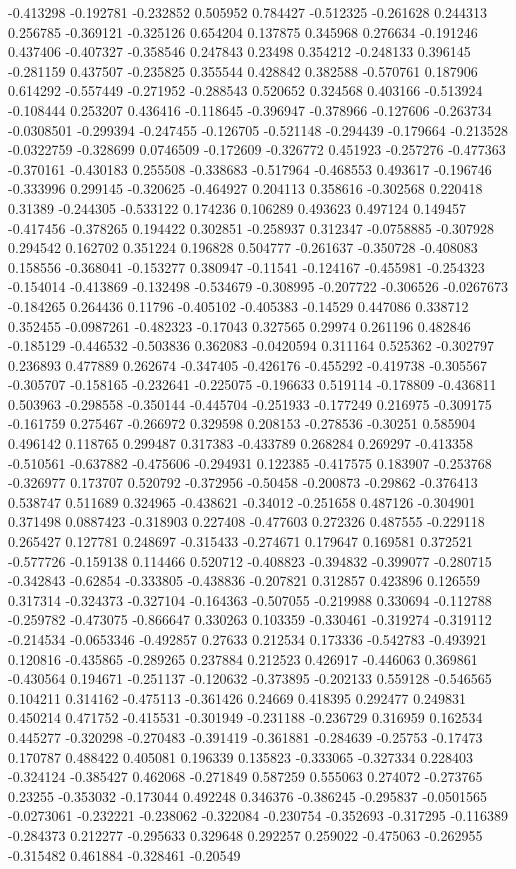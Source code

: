 -0.413298 -0.192781 -0.232852 0.505952 0.784427 -0.512325 -0.261628 0.244313 0.256785 -0.369121 -0.325126 0.654204 0.137875 0.345968 0.276634 -0.191246 0.437406 -0.407327 -0.358546 0.247843 0.23498 0.354212 -0.248133 0.396145 -0.281159 0.437507 -0.235825 0.355544 0.428842 0.382588 -0.570761 0.187906 0.614292 -0.557449 -0.271952 -0.288543 0.520652 0.324568 0.403166 -0.513924 -0.108444 0.253207 0.436416 -0.118645 -0.396947 -0.378966 -0.127606 -0.263734 -0.0308501 -0.299394 -0.247455 -0.126705 -0.521148 -0.294439 -0.179664 -0.213528 -0.0322759 -0.328699 0.0746509 -0.172609 -0.326772 0.451923 -0.257276 -0.477363 -0.370161 -0.430183 0.255508 -0.338683 -0.517964 -0.468553 0.493617 -0.196746 -0.333996 0.299145 -0.320625 -0.464927 0.204113 0.358616 -0.302568 0.220418 0.31389 -0.244305 -0.533122 0.174236 0.106289 0.493623 0.497124 0.149457 -0.417456 -0.378265 0.194422 0.302851 -0.258937 0.312347 -0.0758885 -0.307928 0.294542 0.162702 0.351224 0.196828 0.504777 -0.261637 -0.350728 -0.408083 0.158556 -0.368041 -0.153277 0.380947 -0.11541 -0.124167 -0.455981 -0.254323 -0.154014 -0.413869 -0.132498 -0.534679 -0.308995 -0.207722 -0.306526 -0.0267673 -0.184265 0.264436 0.11796 -0.405102 -0.405383 -0.14529 0.447086 0.338712 0.352455 -0.0987261 -0.482323 -0.17043 0.327565 0.29974 0.261196 0.482846 -0.185129 -0.446532 -0.503836 0.362083 -0.0420594 0.311164 0.525362 -0.302797 0.236893 0.477889 0.262674 -0.347405 -0.426176 -0.455292 -0.419738 -0.305567 -0.305707 -0.158165 -0.232641 -0.225075 -0.196633 0.519114 -0.178809 -0.436811 0.503963 -0.298558 -0.350144 -0.445704 -0.251933 -0.177249 0.216975 -0.309175 -0.161759 0.275467 -0.266972 0.329598 0.208153 -0.278536 -0.30251 0.585904 0.496142 0.118765 0.299487 0.317383 -0.433789 0.268284 0.269297 -0.413358 -0.510561 -0.637882 -0.475606 -0.294931 0.122385 -0.417575 0.183907 -0.253768 -0.326977 0.173707 0.520792 -0.372956 -0.50458 -0.200873 -0.29862 -0.376413 0.538747 0.511689 0.324965 -0.438621 -0.34012 -0.251658 0.487126 -0.304901 0.371498 0.0887423 -0.318903 0.227408 -0.477603 0.272326 0.487555 -0.229118 0.265427 0.127781 0.248697 -0.315433 -0.274671 0.179647 0.169581 0.372521 -0.577726 -0.159138 0.114466 0.520712 -0.408823 -0.394832 -0.399077 -0.280715 -0.342843 -0.62854 -0.333805 -0.438836 -0.207821 0.312857 0.423896 0.126559 0.317314 -0.324373 -0.327104 -0.164363 -0.507055 -0.219988 0.330694 -0.112788 -0.259782 -0.473075 -0.866647 0.330263 0.103359 -0.330461 -0.319274 -0.319112 -0.214534 -0.0653346 -0.492857 0.27633 0.212534 0.173336 -0.542783 -0.493921 0.120816 -0.435865 -0.289265 0.237884 0.212523 0.426917 -0.446063 0.369861 -0.430564 0.194671 -0.251137 -0.120632 -0.373895 -0.202133 0.559128 -0.546565 0.104211 0.314162 -0.475113 -0.361426 0.24669 0.418395 0.292477 0.249831 0.450214 0.471752 -0.415531 -0.301949 -0.231188 -0.236729 0.316959 0.162534 0.445277 -0.320298 -0.270483 -0.391419 -0.361881 -0.284639 -0.25753 -0.17473 0.170787 0.488422 0.405081 0.196339 0.135823 -0.333065 -0.327334 0.228403 -0.324124 -0.385427 0.462068 -0.271849 0.587259 0.555063 0.274072 -0.273765 0.23255 -0.353032 -0.173044 0.492248 0.346376 -0.386245 -0.295837 -0.0501565 -0.0273061 -0.232221 -0.238062 -0.322084 -0.230754 -0.352693 -0.317295 -0.116389 -0.284373 0.212277 -0.295633 0.329648 0.292257 0.259022 -0.475063 -0.262955 -0.315482 0.461884 -0.328461 -0.20549 